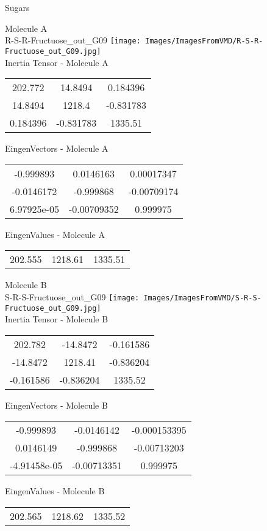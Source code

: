 \vtab[-2cm]
\begin{center}
{\large Sugars}
\end{center}
\begin{multicols}{2}
\begin{center}
Molecule A \\ 
R-S-R-Fructuose\_out\_G09
\texttt{[image: Images/ImagesFromVMD/R-S-R-Fructuose\_out\_G09.jpg]}
\\
Inertia Tensor - Molecule A \\
\vtab
\begin{tabular}{|c c c|}
202.772	 & 	14.8494	 & 	0.184396	 \\
14.8494	 & 	1218.4	 & 	-0.831783	 \\
0.184396	 & 	-0.831783	 & 	1335.51
\end{tabular}

\vtab
 EingenVectors - Molecule A     \\
\vtab
\begin{tabular}{|c c c|}
-0.999893	 & 	0.0146163	 & 	0.00017347	 \\
-0.0146172	 & 	-0.999868	 & 	-0.00709174	 \\
6.97925e-05	 & 	-0.00709352	 & 	0.999975
\end{tabular}

\vtab
 EingenValues - Molecule A     \\
\vtab
\begin{tabular}{|c c c|}
202.555	 & 	1218.61	 & 	1335.51
\end{tabular}
\columnbreak

Molecule B \\ 
S-R-S-Fructuose\_out\_G09
\texttt{[image: Images/ImagesFromVMD/S-R-S-Fructuose\_out\_G09.jpg]}
\\
Inertia Tensor - Molecule B \\
\vtab
\begin{tabular}{|c c c|}
202.782	 & 	-14.8472	 & 	-0.161586	 \\
-14.8472	 & 	1218.41	 & 	-0.836204	 \\
-0.161586	 & 	-0.836204	 & 	1335.52
\end{tabular}

\vtab
 EingenVectors - Molecule B     \\
\vtab
\begin{tabular}{|c c c|}
-0.999893	 & 	-0.0146142	 & 	-0.000153395	 \\
0.0146149	 & 	-0.999868	 & 	-0.00713203	 \\
-4.91458e-05	 & 	-0.00713351	 & 	0.999975
\end{tabular}

\vtab
 EingenValues - Molecule B     \\
\vtab
\begin{tabular}{|c c c|}
202.565	 & 	1218.62	 & 	1335.52
\end{tabular}

\end{center}
\end{multicols}
